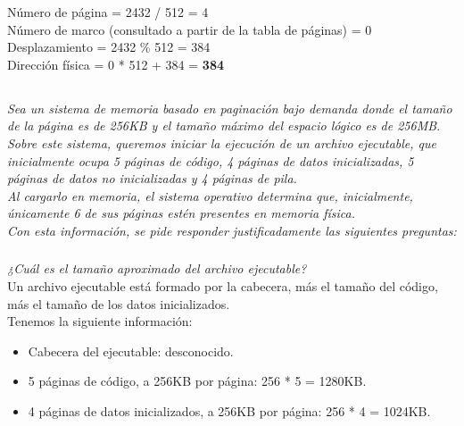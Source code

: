 \documentclass[spanish]{article}
\begin{document}
Número de página = 2432 / 512 = 4\\

Número de marco (consultado a partir de la tabla de páginas)
= 0\\

Desplazamiento = 2432 \% 512 = 384\\

Dirección física = 0 * 512 + 384 = \textbf{384}

\subsection{}

\textit{Sea un sistema de memoria basado en paginación bajo
demanda donde el tamaño de la página es de 256KB y el tamaño
máximo del espacio lógico es de 256MB.}\\

\textit{Sobre este sistema, queremos iniciar la ejecución de
un archivo ejecutable, que inicialmente ocupa 5 páginas de
código, 4 páginas de datos inicializadas, 5 páginas de datos
no inicializadas y 4 páginas de pila.}\\

\textit{Al cargarlo en memoria, el sistema operativo
determina que, inicialmente, únicamente 6 de sus páginas
estén presentes en memoria física.}\\

\textit{Con esta información, se pide responder
justificadamente las siguientes preguntas:}

\subsubsection{}

\textit{¿Cuál es el tamaño aproximado del archivo
ejecutable?}\\

Un archivo ejecutable está formado por la cabecera, más el
tamaño del código, más el tamaño de los datos
inicializados.\\

Tenemos la siguiente información:

\begin{itemize}
\item Cabecera del ejecutable: desconocido.
\item 5 páginas de código, a 256KB por página: 256 * 5 =
1280KB.
\item 4 páginas de datos inicializados, a 256KB por página:
256 * 4 = 1024KB.
\end{itemize}
\end{document}
